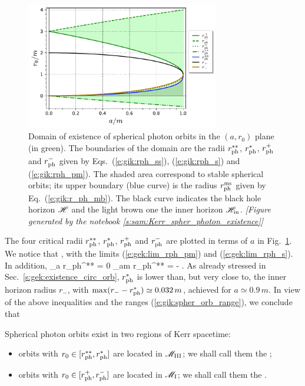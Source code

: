 \begin{figure}
\centerline{\includegraphics[width=0.75\textwidth]{gik_spher_orb_range.pdf}}
\caption[]{\label{f:gik:spher_orb_range} \footnotesize
Domain of existence of spherical photon orbits in the $(a, r_0)$ plane
(in green). The boundaries of the domain are the radii
$r_{\rm ph}^{**}$, $r_{\rm ph}^*$, $r_{\rm ph}^+$ and $r_{\rm ph}^-$
given by Eqs.~(\ref{e:gik:rph_ss}), (\ref{e:gik:rph_s}) and (\ref{e:gik:rph_pm}).
The shaded area correspond to stable spherical orbits; its upper boundary
(blue curve)
is the radius $r_{\rm ph}^{\rm ms}$ given by Eq.~(\ref{e:gik:r_ph_mb}).
The black curve indicates the black hole horizon $\mathscr{H}$ and the light brown one
the inner horizon $\mathscr{H}_{\rm in}$.
\textsl{[Figure generated by the notebook \ref{s:sam:Kerr_spher_photon_existence}]}
}
\end{figure}

The four critical radii $r_{\rm ph}^{**}$, $r_{\rm ph}^*$, $r_{\rm ph}^+$ and $r_{\rm ph}^-$
are plotted in terms of $a$ in Fig.~\ref{f:gik:spher_orb_range}. We notice that
\be
  ,
\ee
with the limits (\ref{e:gek:lim_rph_pm}) and (\ref{e:gek:lim_rph_s}). In addition,
\be
    \lim_{a} r_{\rm ph}^{**} = 0 \qand
    \lim_{a\to m} r_{\rm ph}^{**} = -  .
\ee
As already stressed in Sec.~\ref{s:gek:existence_circ_orb}, $r_{\rm ph}^*$ is lower than, but very close to,
the inner horizon radius $r_{-}$, with  $\max (r_- - r_{\rm ph}^*) \simeq 0.032 \, m$,
achieved for $a\simeq 0.9 \, m$.
In view of the above inequalities and the ranges (\ref{e:gik:spher_orb_range}), we conclude that
\begin{greybox}
Spherical photon orbits exist in two regions of Kerr spacetime:
\begin{itemize}
\item orbits with $r_0\in [r_{\rm ph}^{**}, r_{\rm ph}^*]$ are located in $\mathscr{M}_{\rm III}$;
we shall call them the ;
\item orbits with $r_0 \in [r_{\rm ph}^+, r_{\rm ph}^-]$ are located in $\mathscr{M}_{\rm I}$;
we shall call them the .
\end{itemize}
\end{greybox}

